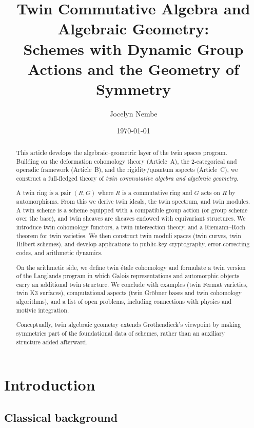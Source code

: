 \documentclass[11pt,a4paper]{article}
\title{\textbf{Twin Commutative Algebra and Algebraic Geometry:\\
		Schemes with Dynamic Group Actions and the Geometry of Symmetry}}
\author{Jocelyn Nembe}
\date{\today}
\numberwithin{equation}{section}
\begin{document}
	
	\maketitle
	
	\begin{abstract}
		This article develops the algebraic–geometric layer of the twin spaces program.
		Building on the deformation cohomology theory (Article~A), the 2-categorical and operadic framework
		(Article~B), and the rigidity/quantum aspects (Article~C), we construct a full-fledged theory of 
		\emph{twin commutative algebra and algebraic geometry}.
		
		A twin ring is a pair $(R,G)$ where $R$ is a commutative ring and $G$ acts on $R$ by automorphisms.
		From this we derive twin ideals, the twin spectrum, and twin modules.
		A twin scheme is a scheme equipped with a compatible group action (or group scheme over the base), 
		and twin sheaves are sheaves endowed with equivariant structures.
		We introduce twin cohomology functors, a twin intersection theory, and a Riemann--Roch theorem for 
		twin varieties. We then construct twin moduli spaces (twin curves, twin Hilbert schemes), and develop 
		applications to public-key cryptography, error-correcting codes, and arithmetic dynamics.
		
		On the arithmetic side, we define twin \'etale cohomology and formulate a twin version of the Langlands program
		in which Galois representations and automorphic objects carry an additional twin structure.
		We conclude with examples (twin Fermat varieties, twin K3 surfaces), computational aspects
		(twin Gr\"obner bases and twin cohomology algorithms), and a list of open problems, including connections 
		with physics and motivic integration.
		
		Conceptually, twin algebraic geometry extends Grothendieck’s viewpoint by making symmetries 
		part of the foundational data of schemes, rather than an auxiliary structure added afterward.
	\end{abstract}
	
	\tableofcontents
	
	\section{Introduction}
	\label{sec:intro}
	
	\subsection{Classical background}
	
\end{document}
